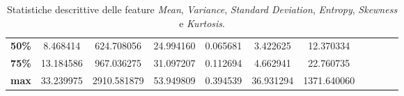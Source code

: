 \begin{table}[!ht]
\begin{subtable}[h]{1\textwidth}
\begin{tabular}{c|c c c c c c c c c c}
                  \textbf{50\%}                                             & 8.468414      & 624.708056        & 24.994160                   & 0.065681                                 & 3.422625          & 12.370334         \\
                  \textbf{75\%}                                             & 13.184586     & 967.036275        & 31.097207                   & 0.112694                                 & 4.662941          & 22.760735         \\
                  \textbf{max}                                              & 33.239975     & 2910.581879       & 53.949809                   & 0.394539                                 & 36.931294         & 1371.640060       \\ \hline
            \end{tabular}
            \caption{Statistiche descrittive delle feature \textit{Mean}, \textit{Variance}, \textit{Standard Deviation}, \textit{Entropy}, \textit{Skewness} e \textit{Kurtosis}.}
            \label{tab:primameta}
      \end{subtable}
      \hfill
      \begin{subtable}[h]{1\textwidth}
            \centering
\end{subtable}
\end{table}
